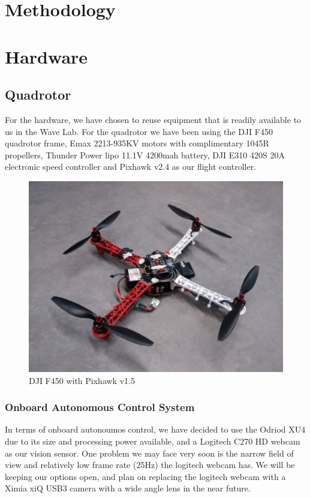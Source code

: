 \documentclass[11pt, twocolumn]{article}
\begin{document}
\section{Methodology}

\section{Hardware}
\subsection{Quadrotor}
For the hardware, we have chosen to reuse equipment that is readily available to us in the Wave Lab. For the quadrotor we have been using the DJI F450 quadrotor frame, Emax 2213-935KV motors with complimentary 1045R propellers, Thunder Power lipo 11.1V 4200mah battery, DJI E310 420S 20A electronic speed controller and Pixhawk v2.4 as our flight controller.

\begin{figure}[H]
	\centering
	\includegraphics[width=0.8\linewidth]{images/quadrotor.jpg}
	\caption{DJI F450 with Pixhawk v1.5}
\end{figure}

\subsubsection{Onboard Autonomous Control System}
In terms of onboard autonoumos control, we have decided to use the Odriod XU4 due to its size and processing power available, and a Logitech C270 HD webcam as our vision sensor. One problem we may face very soon is the narrow field of view and relatively low frame rate (25Hz) the logitech webcam has. We will be keeping our options open, and plan on replacing the logitech webcam with a Ximia xiQ USB3 camera with a wide angle lens in the near future.
\end{document}
